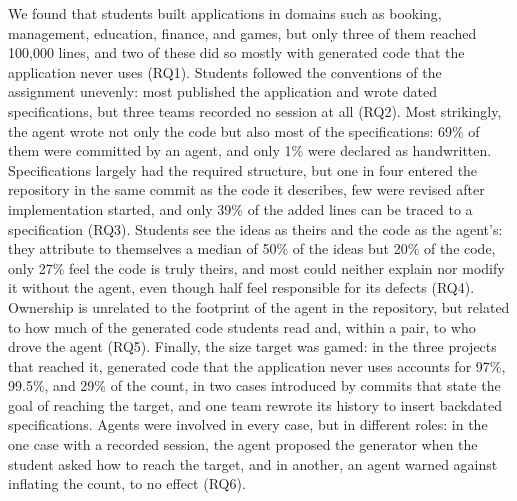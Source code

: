 \documentclass[conference]{IEEEtran}
\begin{document}
We found that students built applications in domains such as booking, management, education, finance, and games, but only three of them reached 100,000 lines, and two of these did so mostly with generated code that the application never uses (RQ1). Students followed the conventions of the assignment unevenly: most published the application and wrote dated specifications, but three teams recorded no session at all (RQ2). Most strikingly, the agent wrote not only the code but also most of the specifications: 69\% of them were committed by an agent, and only 1\% were declared as handwritten. Specifications largely had the required structure, but one in four entered the repository in the same commit as the code it describes, few were revised after implementation started, and only 39\% of the added lines can be traced to a specification (RQ3). Students see the ideas as theirs and the code as the agent's: they attribute to themselves a median of 50\% of the ideas but 20\% of the code, only 27\% feel the code is truly theirs, and most could neither explain nor modify it without the agent, even though half feel responsible for its defects (RQ4). Ownership is unrelated to the footprint of the agent in the repository, but related to how much of the generated code students read and, within a pair, to who drove the agent (RQ5). Finally, the size target was gamed: in the three projects that reached it, generated code that the application never uses accounts for 97\%, 99.5\%, and 29\% of the count, in two cases introduced by commits that state the goal of reaching the target, and one team rewrote its history to insert backdated specifications. Agents were involved in every case, but in different roles: in the one case with a recorded session, the agent proposed the generator when the student asked how to reach the target, and in another, an agent warned against inflating the count, to no effect (RQ6).
\end{document}
